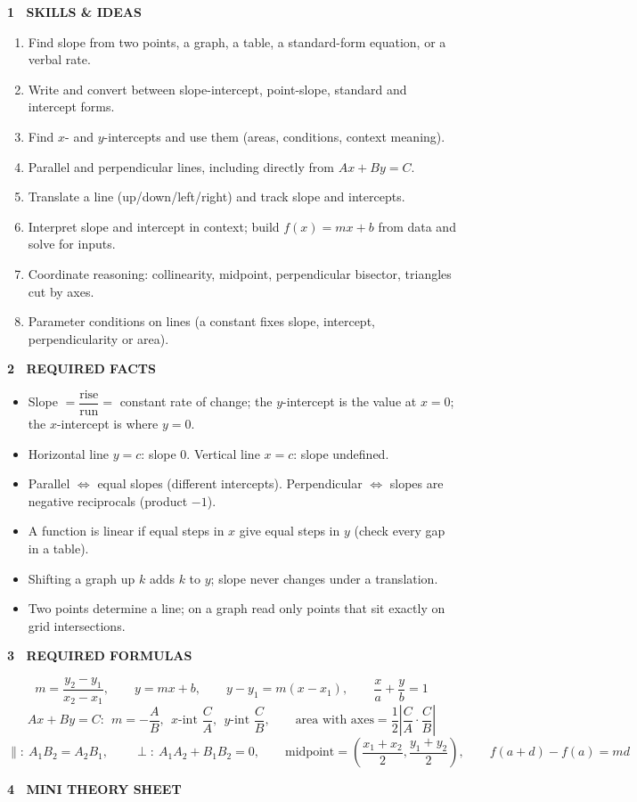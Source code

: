 \documentclass[10pt]{article}
\newcommand{\banner}[1]{\vspace{6pt}\par\noindent\begin{tcolorbox}[enhanced,colback=NAVY,colframe=NAVY,boxrule=0pt,arc=2pt,left=6pt,top=1pt,bottom=1pt,nobeforeafter]\color{white}\bfseries\small\MakeUppercase{#1}\end{tcolorbox}\par\nopagebreak\vspace{2pt}}
\begin{document}
\banner{1 \textperiodcentered\ Skills \& Ideas}
\begin{enumerate}[leftmargin=1.6em,itemsep=0pt,label=\textbf{S\arabic*.}]
\item Find slope from two points, a graph, a table, a standard-form equation, or a verbal rate.
\item Write and convert between slope-intercept, point-slope, standard and intercept forms.
\item Find $x$- and $y$-intercepts and use them (areas, conditions, context meaning).
\item Parallel and perpendicular lines, including directly from $Ax+By=C$.
\item Translate a line (up/down/left/right) and track slope and intercepts.
\item Interpret slope and intercept in context; build $f(x)=mx+b$ from data and solve for inputs.
\item Coordinate reasoning: collinearity, midpoint, perpendicular bisector, triangles cut by axes.
\item Parameter conditions on lines (a constant fixes slope, intercept, perpendicularity or area).
\end{enumerate}
\banner{2 \textperiodcentered\ Required Facts}
\begin{itemize}[leftmargin=1.4em,itemsep=0pt]
\item Slope $=\dfrac{\text{rise}}{\text{run}}=$ constant rate of change; the $y$-intercept is the value at $x=0$; the $x$-intercept is where $y=0$.
\item Horizontal line $y=c$: slope $0$. Vertical line $x=c$: slope undefined.
\item Parallel $\iff$ equal slopes (different intercepts). Perpendicular $\iff$ slopes are negative reciprocals (product $-1$).
\item A function is linear if equal steps in $x$ give equal steps in $y$ (check every gap in a table).
\item Shifting a graph up $k$ adds $k$ to $y$; slope never changes under a translation.
\item Two points determine a line; on a graph read only points that sit exactly on grid intersections.
\end{itemize}
\banner{3 \textperiodcentered\ Required Formulas}
\vspace{-4pt}\[
m=\dfrac{y_2-y_1}{x_2-x_1},\qquad y=mx+b,\qquad y-y_1=m(x-x_1),\qquad \dfrac xa+\dfrac yb=1
\]
\vspace{-8pt}\[
Ax+By=C:\ \ m=-\dfrac AB,\ \ \text{$x$-int }\dfrac CA,\ \ \text{$y$-int }\dfrac CB,\qquad \text{area with axes}=\dfrac12\left|\dfrac CA\cdot\dfrac CB\right|
\]
\vspace{-8pt}\[
\parallel:\ A_1B_2=A_2B_1,\qquad \perp:\ A_1A_2+B_1B_2=0,\qquad \text{midpoint}=\left(\dfrac{x_1+x_2}2,\dfrac{y_1+y_2}2\right),\qquad f(a+d)-f(a)=md
\]
\banner{4 \textperiodcentered\ Mini Theory Sheet}
\end{document}
